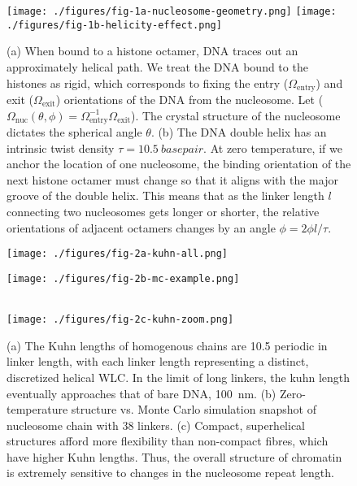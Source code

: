 \documentclass[%
 reprint,
superscriptaddress,
showpacs,preprintnumbers,
 amsmath,amssymb,
 aps,
 prl,
]{revtex4-1}
\begin{document}

\begin{figure}[t]
    \centering
    \texttt{[image: ./figures/fig-1a-nucleosome-geometry.png]}
    \texttt{[image: ./figures/fig-1b-helicity-effect.png]}
    \caption{(a) When bound to a histone octamer, DNA traces out an
    approximately helical path. We treat the DNA bound to the histones as rigid,
    which corresponds to fixing the entry ($\Omega_\text{entry}$) and exit
    ($\Omega_\text{exit}$) orientations of the DNA from the nucleosome. Let
    ($\Omega_\text{nuc}(\theta, \phi)  =
    \Omega_\text{entry}^{-1}\Omega_\text{exit}$). The crystal structure of the
    nucleosome dictates the spherical angle $\theta$. 
    (b) The DNA double helix has an intrinsic twist density
    $\tau=\SI{10.5}{basepair}$. At zero
    temperature, if we anchor the location of one nucleosome, the binding
    orientation of the next histone octamer must change so that it aligns with
    the major groove of the double helix. This means that as the linker length
    $l$ connecting two nucleosomes gets longer or shorter, the relative
    orientations of adjacent octamers changes by an angle $\phi = 2\phi l/\tau$.
    }\label{fig:nuc-geo}
\end{figure}
\begin{figure}[t]
    \centering
    \begin{minipage}{0.65\linewidth}
        \texttt{[image: ./figures/fig-2a-kuhn-all.png]}
    \end{minipage}
    \begin{minipage}{0.30\linewidth}
        \vfill
        \texttt{[image: ./figures/fig-2b-mc-example.png]}
        \vfill
    \end{minipage}
    \\
    \texttt{[image: ./figures/fig-2c-kuhn-zoom.png]}
    \caption{(a) The Kuhn lengths of homogenous chains are
    \SI{10.5}{\basepair} periodic
    in linker length, with each linker length representing a distinct,
    discretized helical
    WLC. In the limit of long linkers, the kuhn length eventually approaches that of bare DNA,
    \SI{100}{\nano\metre}. (b) Zero-temperature structure vs. Monte Carlo simulation
    snapshot of nucleosome chain with \SI{38}{\basepair} linkers. (c) Compact, superhelical structures afford more
    flexibility than non-compact fibres, which have higher Kuhn lengths. Thus,
    the overall structure of chromatin is extremely sensitive to changes in the
    nucleosome repeat length.}
\end{figure}
\end{document}
